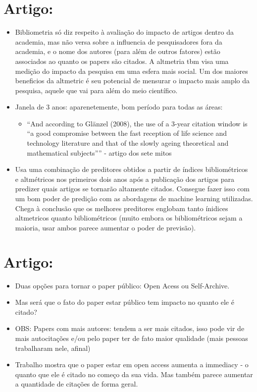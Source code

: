 \documentclass[11pt]{article}
\begin{document}
\section{Artigo: \cite{wang2019}}
\label{sec:org74cfa22}

\begin{itemize}
\item Bibliometria só diz respeito à avaliação do impacto de artigos dentro da academia, mas não versa sobre a influencia de pesquisadores fora da academia, e o nome dos autores (para além de outros fatores) estão associados ao quanto os papers são citados. A altmetria tbm visa uma medição do impacto da pesquisa em uma esfera mais social. Um dos maiores beneficios da altmetric é seu potencial de mensurar o impacto mais amplo da pesquisa, aquele que vai para além do meio científico.
\item Janela de 3 anos: aparenetemente, bom período para todas as áreas:
\begin{itemize}
\item ``And according to Glänzel (2008), the use of a 3-year citation window is “a good compromise between the fast reception of life science and technology literature and that of the slowly ageing theoretical and mathematical subjects”'' - artigo dos sete mitos
\end{itemize}
\item Usa uma combinação de preditores obtidos a partir de índices bibliométricos e altmétricos nos primeiros dois anos após a publicação dos artigos para predizer quais artigos se tornarão altamente citados. Consegue fazer isso com um bom poder de predição com as abordagens de machine learning utilizadas. Chega à conclusão que os melhores preditores englobam tanto ínidices altmetricos quanto bibliométricos (muito embora os bibliométricos sejam a maioria, usar ambos parece aumentar o poder de previsão).
\end{itemize}


\section{Artigo: \cite{eysenbach2006}}
\label{sec:org8ca404f}

\begin{itemize}
\item Duas opções para tornar o paper público: Open Acess ou Self-Archive.
\item Mas será que o fato do paper estar público tem impacto no quanto ele é citado?
\item OBS: Papers com mais autores: tendem a ser mais citados, isso pode vir de mais autocitações e/ou pelo paper ter de fato maior qualidade (mais pessoas trabalharam nele, afinal)
\item Trabalho mostra que o paper estar em open access aumenta a immediacy - o quanto que ele é citado no começo da sua vida. Mas também parece aumentar a quantidade de citações de forma geral.
\end{itemize}
\end{document}
